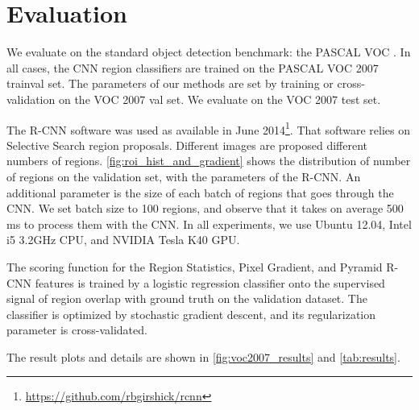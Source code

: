 \section{Evaluation}\label{sec:evaluation}

We evaluate on the standard object detection benchmark: the PASCAL VOC \cite{pascal-voc-2010}.
In all cases, the CNN region classifiers are trained on the PASCAL VOC 2007 trainval set.
The parameters of our methods are set by training or cross-validation on the VOC 2007 val set.
We evaluate on the VOC 2007 test set.

The R-CNN software was used as available in June 2014\footnote{\url{https://github.com/rbgirshick/rcnn}}.
That software relies on Selective Search \cite{Uijlings-IJCV-2013} region proposals.
Different images are proposed different numbers of regions.
\autoref{fig:roi_hist_and_gradient} shows the distribution of number of regions on the validation set, with the parameters of the R-CNN.
An additional parameter is the size of each batch of regions that goes through the CNN.
We set batch size to 100 regions, and observe that it takes on average 500 ms to process them with the CNN.
In all experiments, we use Ubuntu 12.04, Intel i5 3.2GHz CPU, and NVIDIA Tesla K40 GPU.

The scoring function for the Region Statistics, Pixel Gradient, and Pyramid R-CNN features is trained by a logistic regression classifier onto the supervised signal of region overlap with ground truth on the validation dataset.
The classifier is optimized by stochastic gradient descent, and its regularization parameter is cross-validated.

The result plots and details are shown in \autoref{fig:voc2007_results} and \autoref{tab:results}.

